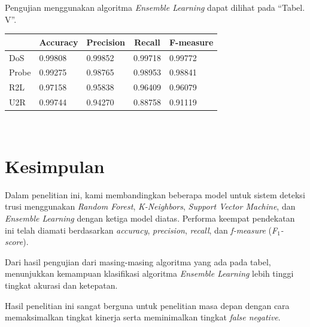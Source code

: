 \documentclass[conference]{IEEEtran}
\begin{document}
\noindent Pengujian menggunakan algoritma \emph{Ensemble Learning} dapat dilihat pada ``Tabel. V''.\vspace{6pt}

\begin{minipage}{\linewidth}
\begin{center}
\begin{tabular}{|l|l|l|l|l|}
\hline
\multicolumn{1}{|c|}{\textbf{}}&\multicolumn{1}{|c|}{\textbf{Accuracy}}&\multicolumn{1}{|c|}{\textbf{Precision}}&\multicolumn{1}{|c|}{\textbf{Recall}}&\multicolumn{1}{|c|}{\textbf{F-measure}} \\
\hline
DoS & 0.99808 & 0.99852 & 0.99718 & 0.99772\\
\hline
Probe & 0.99275 & 0.98765 & 0.98953 & 0.98841\\
\hline
R2L & 0.97158 & 0.95838 & 0.96409 & 0.96079\\
\hline
U2R & 0.99744 & 0.94270 & 0.88758 & 0.91119\\
\hline
\end{tabular}
\label{tab5}
\end{center}
\end{minipage}\\

\section{Kesimpulan}

Dalam penelitian ini, kami membandingkan beberapa model untuk sistem deteksi trusi menggunakan \emph{Random Forest}, \emph{K-Neighbors}, \emph{Support Vector Machine}, dan \emph{Ensemble  Learning} dengan ketiga model diatas. Performa keempat pendekatan ini telah diamati berdasarkan \emph{accuracy}, \emph{precision}, \emph{recall}, dan \emph{f-measure} (\emph{F$_1$-score}).

Dari hasil pengujian dari masing-masing algoritma yang ada pada tabel, menunjukkan kemampuan klasifikasi algoritma \emph{Ensemble  Learning} lebih tinggi tingkat akurasi dan ketepatan.

Hasil penelitian ini sangat berguna untuk penelitian masa depan dengan cara memaksimalkan tingkat kinerja serta meminimalkan tingkat \emph{false negative}.




\vspace{12pt}
\end{document}
